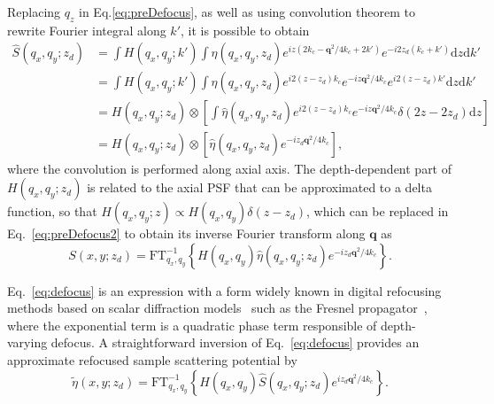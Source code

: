 Replacing $q_z$ in Eq.\eqref{eq:preDefocus}, as well as using convolution theorem to rewrite Fourier integral along $k'$, it is possible to obtain~\cite{South2016_Computed}
\begin{align}\label{eq:preDefocus2}
    \hat{S}(q_x,q_y; z_d) &= \int H(q_x, q_y; k') \int \hat{\eta}(q_x,q_y, z_d) e^{iz(2k_c - \mathbf{q}^2/4k_c + 2k')} e^{-i2z_d(k_c+k')} \text{d}z\text{d}k' \nonumber \\
    &= \int H(q_x, q_y; k') \int \hat{\eta}(q_x,q_y, z_d) e^{i2(z-z_d)k_c} e^{-iz\mathbf{q}^2/4k_c} e^{i2(z-z_d)k'} \text{d}z\text{d}k' \nonumber \\
    &= H(q_x, q_y; z_d) \otimes \left[ \int \hat{\eta}(q_x,q_y, z_d) e^{i2(z-z_d)k_c} e^{-iz\mathbf{q}^2/4k_c}  \delta(2z-2z_d) \text{d}z\right] \nonumber \\
    &= H(q_x, q_y; z_d) \otimes \left[ \hat{\eta}(q_x,q_y, z_d) e^{-iz_d\mathbf{q}^2/4k_c}  \right],
\end{align}
where the convolution is performed along axial axis. The depth-dependent part of $H(q_x,q_y;z_d)$ is related to the axial PSF that can be approximated to a delta function, so that $H(q_x, q_y; z) \propto H(q_x, q_y)\delta(z-z_d)$, which can be replaced in Eq.~\eqref{eq:preDefocus2} to obtain its inverse Fourier transform along $\mathbf{q}$ as
\begin{equation}\label{eq:defocus}
    S(x, y; z_d) = \text{FT}^{-1}_{q_x, q_y}\left\{H(q_x, q_y)\hat{\eta}(q_x, q_y; z_d) e^{-iz_d\mathbf{q}^2/4k_c}\right\}.
\end{equation}

Eq.~\eqref{eq:defocus} is an expression with a form widely known in digital refocusing methods based on scalar diffraction models~\cite{Ralston2005_Deconvolution, Yu2007_Improved, Liu2009_Deconvolution} such as the Fresnel propagator~\cite{Yasuno2006_Noniterative}, where the exponential term is a quadratic phase term responsible of depth-varying defocus. A straightforward inversion of Eq.~\eqref{eq:defocus} provides an approximate refocused sample scattering potential by~\cite{South2016_Computed}
\begin{equation}\label{eq:refocus}
    \tilde{\eta}(x,y; z_d) = \text{FT}^{-1}_{q_x, q_y}\left\{H(q_x, q_y)\hat{S}(q_x, q_y; z_d) e^{iz_d\mathbf{q}^2/4k_c}\right\}.
\end{equation}

